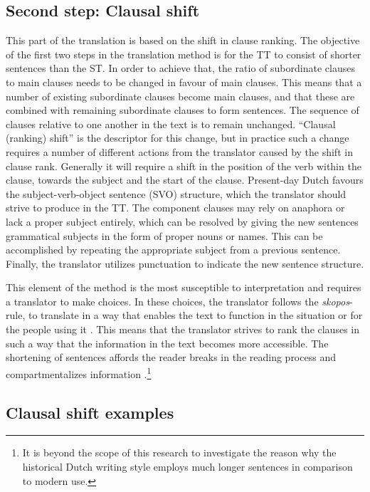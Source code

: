 \begin{paper}
\subsection{Second step: Clausal
shift}

This part of the translation is based on the shift in clause ranking.
The objective of the first two steps in the translation method is for
the TT to consist of shorter sentences than the ST. In order to achieve
that, the ratio of subordinate clauses to main clauses needs to be
changed in favour of main clauses. This means that a number of existing
subordinate clauses become main clauses, and that these are combined
with remaining subordinate clauses to form sentences. The sequence of
clauses relative to one another in the text is to remain unchanged.
``Clausal (ranking) shift'' is the descriptor for this change, but in
practice such a change requires a number of different actions from the
translator caused by the shift in clause rank. Generally it will require
a shift in the position of the verb within the clause, towards the
subject and the start of the clause. Present-day Dutch favours the
subject-verb-object sentence (SVO) structure, which the translator
should strive to produce in the TT. The component clauses may rely on
anaphora or lack a proper subject entirely, which can be resolved by
giving the new sentences grammatical subjects in the form of proper
nouns or names. This can be accomplished by repeating the appropriate
subject from a previous sentence. Finally, the translator utilizes
punctuation to indicate the new sentence structure.

This element of the method is the most susceptible to interpretation and
requires a translator to make choices. In these choices, the translator
follows the \emph{skopos}-rule, to translate in a way that enables the
text to function in the situation or for the people using it \citep[55]{hill-madsen_derivation_2014}. This means that the translator strives to rank
the clauses in such a way that the information in the text becomes more
accessible. The shortening of sentences affords the reader breaks in the
reading process and compartmentalizes information \citep[62]{shardlow_survey_2014}.\footnote{It is beyond the scope of this research to investigate the
  reason why the historical Dutch writing style employs much longer
  sentences in comparison to modern use.}

\subsection{Clausal shift examples}


\end{paper}
